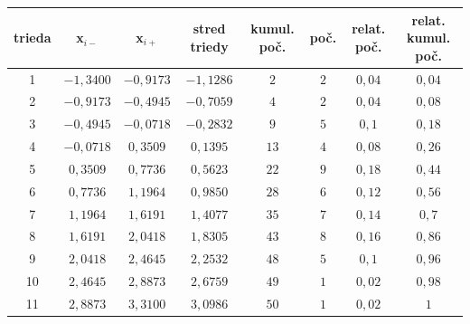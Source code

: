 \documentclass[pdftex, 11pt, a4paper, titlepage]{article}
\begin{document}
    \begin{tabular}[]{|c|c|c|c|c|c|c|c|}
        \hline
        \textbf{trieda} & \textbf{x$_{i-}$} & \textbf{x$_{i+}$} & \textbf{stred triedy} & \textbf{kumul. poč.} & \textbf{poč.} & \textbf{relat. poč.} & \textbf{relat. kumul. poč.} \\
        \hline
        1   &   $-1,3400$ & $-0,9173$   &   $-1,1286$ & $2$ &   $2$ & $0,04$ &  $0,04$ \\
        2   &   $-0,9173$ & $-0,4945$   &   $-0,7059$ & $4$ &   $2$ & $0,04$ &  $0,08$ \\
        3   &   $-0,4945$ & $-0,0718$   &   $-0,2832$ & $9$ &   $5$ & $0,1$ &   $0,18$ \\
        4   &   $-0,0718$ & $0,3509$    &   $0,1395$ &  $13$ &  $4$ & $0,08$ &  $0,26$ \\
        5   &   $0,3509$  & $0,7736$   &    $0,5623$ &   $22$ &  $9$ & $0,18$ &  $0,44$ \\
        6   &   $0,7736$  & $1,1964$   &    $0,9850$ &   $28$ &  $6$ & $0,12$ &  $0,56$ \\
        7   &   $1,1964$  & $1,6191$   &    $1,4077$ &   $35$ &  $7$ & $0,14$ &  $0,7$ \\
        8   &   $1,6191$  & $2,0418$   &    $1,8305$ &   $43$ &  $8$ & $0,16$ &  $0,86$ \\
        9   &   $2,0418$  & $2,4645$   &    $2,2532$ &   $48$ &  $5$ & $0,1$ &   $0,96$ \\
        10  &   $2,4645$   & $2,8873$   &   $2,6759$ &   $49$ &  $1$ & $0,02$ &  $0,98$ \\
        11  &   $2,8873$   & $3,3100$   &   $3,0986$ &   $50$ &  $1$ & $0,02$ &  $1$ \\
        \hline
    \end{tabular}
\end{document}
